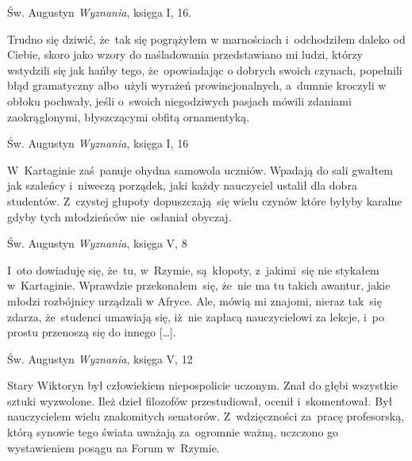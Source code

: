 \documentclass[a4paper,11pt]{article}
\newcommand{\attribA}[1]{#1}
\begin{document}
\attribA{Św. Augustyn \textit{Wyznania}, księga I, 16.}

\vspace{\spaceThree}



\noindent
Trudno się dziwić, że~tak się pogrążyłem w marnościach
i~odchodziłem daleko od Ciebie, skoro jako wzory do naśladowania
przedstawiano mi ludzi, którzy wstydzili się jak hańby tego,
że~opowiadając o dobrych swoich czynach, popełnili błąd gramatyczny
albo~użyli wyrażeń prowincjonalnych, a~dumnie kroczyli w obłoku
pochwały, jeśli o~swoich niegodziwych pasjach mówili zdaniami
zaokrąglonymi, błyszczącymi obfitą ornamentyką.


\attribA{Św. Augustyn \textit{Wyznania}, księga I, 16}

\vspace{\spaceThree}



\noindent
W~Kartaginie zaś~panuje ohydna samowola uczniów. Wpadają do sali
gwałtem jak szaleńcy i~niweczą porządek, jaki każdy nauczyciel ustalił
dla dobra studentów. Z~czystej głupoty dopuszczają~się wielu czynów
które byłyby karalne gdyby tych młodzieńców nie~osłaniał obyczaj.


\attribA{Św. Augustyn \textit{Wyznania}, księga V, 8}

\vspace{\spaceThree}



\noindent
I~oto dowiaduję się, że~tu, w~Rzymie, są~kłopoty, z~jakimi~się
nie stykałem w~Kartaginie. Wprawdzie przekonałem~się, że~nie ma tu
takich awantur, jakie młodzi rozbójnicy urządzali w Afryce. Ale, mówią
mi znajomi, nieraz tak~się zdarza, że~studenci umawiają się, iż~nie
zapłacą nauczycielowi za lekcje, i~po prostu przenoszą się do
innego [\ldots].


\attribA{Św. Augustyn \textit{Wyznania}, księga V, 12}

\vspace{\spaceThree}



\noindent
Stary Wiktoryn był człowiekiem niepospolicie uczonym. Znał do
głębi wszystkie sztuki wyzwolone. Ileż dzieł filozofów przestudiował,
ocenił i~skomentował. Był nauczycielem wielu znakomitych
senatorów. Z~wdzięczności za~pracę profesorską, którą synowie tego
świata uważają za~ogromnie ważną, uczczono go wystawieniem posągu na
Forum w~Rzymie.
\end{document}
